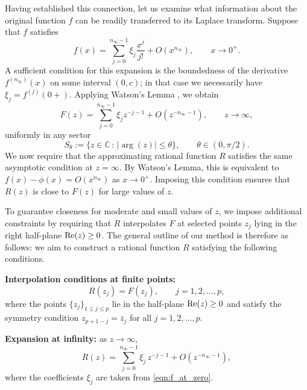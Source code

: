 \documentclass[12pt]{article}
\def\re{\textnormal {Re}}
\def\c{{\mathbb C}}
\begin{document}
Having established this connection, let us examine what information about the original function $f$ can be readily transferred to its Laplace transform. Suppose that $f$ satisfies
\begin{equation}\label{eqn:f_at_zero}
f(x)=\sum_{j=0}^{n_{\infty}-1} \xi_j\frac{x^j}{j!}+O(x^{n_{\infty}}), \qquad x\to 0^+.
\end{equation}
A sufficient condition for this expansion is the boundedness of the derivative $f^{(n_{\infty})}(x)$ on some interval $(0,c)$; in that case we necessarily have $\xi_j=f^{(j)}(0+)$. Applying Watson's Lemma \cite{Wong_1972}, we obtain
\begin{equation}\label{eqn:F_at_infinity}
F(z) = \sum_{j=0}^{n_{\infty}-1} \xi_j z^{-j-1}
+ O(z^{-n_{\infty}-1}), \qquad z\to \infty,
\end{equation}
uniformly in any sector 
\[
S_{\theta}:=\{ z\in \c \, : \, |\arg(z)|\le \theta\}, \qquad \theta \in (0,\pi/2).
\]
We now require that the approximating rational function $R$ satisfies the same asymptotic condition at $z=\infty$. By Watson's Lemma, this is equivalent to $f(x)-\phi(x)=O(x^{n_{\infty}})$ as $x\to 0^+$. Imposing this condition ensures that $R(z)$ is close to $F(z)$ for large values of $z$.  

To guarantee closeness for moderate and small values of $z$, we impose additional constraints by requiring that $R$ interpolates $F$ at selected points $z_j$ lying in the right half-plane $\re(z) \ge 0$. The general outline of our method is therefore as follows: we aim to construct a rational function $R$ satisfying the following conditions.  

\vspace{0.2cm}

\noindent
{\bf Interpolation conditions at finite points:}
\begin{equation}\label{eqn:Phi_at_z_j}
R(z_j)=F(z_j), \qquad j=1,2,\dots,p, 
\end{equation}
where the points $\{z_j\}_{1\le j \le p}$ lie in the half-plane $\re(z) \ge 0$ and satisfy the symmetry condition $z_{p+1-j}=\overline z_j$ for all $j=1,2,\dots,p$.

\vspace{0.2cm}

\noindent
{\bf Expansion at infinity:}
as $z\to \infty$,
\begin{equation}\label{eqn:Phi_at_infty}
R(z)=\sum_{j=0}^{n_{\infty}-1} \xi_{j}\, z^{-j-1}+O(z^{-n_{\infty}-1}),
\end{equation}
where the coefficients $\xi_j$ are taken from \eqref{eqn:f_at_zero}.  
\end{document}
